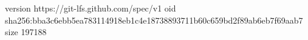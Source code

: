 version https://git-lfs.github.com/spec/v1
oid sha256:bba3c6ebb5ea783114918eb1c4e18738893711b60c659bd2f89ab6eb7f69aab7
size 197188
